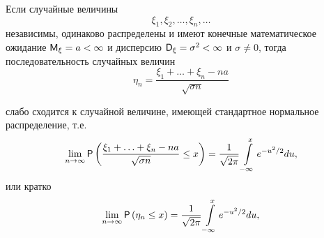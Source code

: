 \begin{theorem}
Если случайные величины $$\xi_1 , \xi_2 , \ldots , \xi_n , \ldots$$ независимы, одинаково распределены и имеют конечные математическое ожидание $\M_{\xi} = a < \infty$ и дисперсию $\D_{\xi} = \sigma^2 < \infty$ и $\sigma \ne 0$, тогда последовательность случайных величин
$$
\eta_n =
\frac{
	\xi_1 + \ldots + \xi_n - na
}{\sqrt{\sigma n}}
$$

слабо сходится к случайной величине, имеющей стандартное нормальное распределение, т.е.
$$
\lim\limits_{n\to\infty}
\P\left(
	\frac{
		\xi_1 + \ldots + \xi_n - na
	}{\sqrt{\sigma n}}\leq x
\right)
=\frac{1}{\sqrt{2\pi}}\int\limits_{-\infty}^x e^{-u^2/2} du,
$$
или кратко
$$
\lim\limits_{n\to\infty}
\P\left(
	\eta_n \leq x
\right)
=\frac{1}{\sqrt{2\pi}}\int\limits_{-\infty}^x e^{-u^2/2} du,
$$
\end{theorem}

